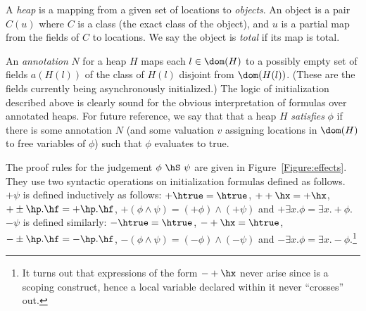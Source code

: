 A {\em heap} is a mapping from a given set of locations to {\em
  objects}. An object is a pair $C(u)$ where $C$ is a class (the exact
class of the object), and $u$ is a partial map from the fields of $C$
to locations. We say the object is {\em total} if its map is total.

An {\em annotation} $N$ for a heap $H$ maps each $l \in \dom(H)$ to a
possibly empty set of fields $a(H(l))$ of the class of $H(l)$ disjoint
from $\dom(H(l))$. (These are the fields currently being
asynchronously initialized.) The logic of initialization described
above is clearly sound for the obvious interpretation of formulas over
annotated heaps. For future reference, we say that that a heap $H$
{\em satisfies} $\phi$ if there is some annotation $N$ (and some
valuation $v$ assigning locations in $\dom(H)$ to free variables of
$\phi$) such that $\phi$ evaluates to true.

The proof rules for the judgement $\phi~\hS~\psi$ are given in
Figure~\ref{Figure:effects}. They use two syntactic operations on initialization
formulas defined as follows.
$+\psi$ is defined inductively as follows:
$+\htrue=\htrue$,
$++\hx=+\hx$,
$+\pm\hp.\hf=+\hp.\hf$,
$+(\phi \wedge\psi)=(+\phi)\wedge(+\psi)$
and $+\exists x.\phi=\exists x.+\phi$.
$-\psi$ is defined similarly:
$-\htrue=\htrue$,
$-+\hx=\htrue$,
$-\pm\hp.\hf=-\hp.\hf$,
$-(\phi \wedge\psi)=(-\phi)\wedge(-\psi)$
and $-\exists x.\phi=\exists x.-\phi$.\footnote{It turns out that
  expressions of the form $-+\hx$ never arise since \async{} is a
  scoping construct, hence a local variable declared within it never
  ``crosses'' out.}

